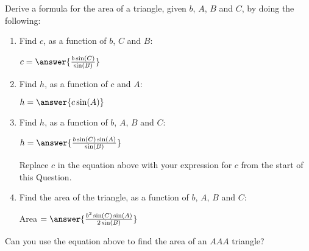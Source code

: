 \documentclass[number]{ximera}
\begin{document}
\begin{question}
 Derive a formula for the area of a triangle, given $b$, $A$, $B$ and $C$, by doing the following:

\begin{image}

\end{image}
 
\begin{enumerate}
\item Find $c$, as a function of $b$, $C$ and $B$:

$c=\answer{\frac{b\sin(C)}{\sin(B)}}$

\item Find $h$, as a function of $c$ and $A$:

$h=\answer{c\sin(A)}$

\item Find $h$, as a function of $b$, $A$, $B$ and $C$:

$h=\answer{\frac{b\sin(C)\sin(A)}{\sin(B)}}$

\begin{hint}
Replace $c$ in the equation above with your expression for $c$ from the start of this Question.
\end{hint}

\item Find the area of the triangle, as a function of $b$, $A$, $B$ and $C$:

Area $= \answer{\frac{b^2\sin(C)\sin(A)}{2\sin(B)}}$

\end{enumerate}

\end{question}

\begin{question}
Can you use the equation above to find the area of an $AAA$ triangle?
\begin{multipleChoice}
\end{multipleChoice}
\end{question}

 
\end{document}
